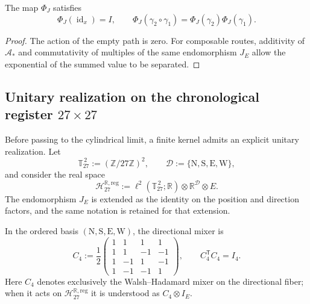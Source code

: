 \begin{proposition}
\label{prop:fase-interna-functor-rev2}
The map \(\Phi_J\) satisfies
\[
 \Phi_J(\operatorname{id}_x)=I,
 \qquad
 \Phi_J(\gamma_2\circ\gamma_1)
 =\Phi_J(\gamma_2)\Phi_J(\gamma_1).
\]
\end{proposition}

\begin{proof}
The action of the empty path is zero. For composable routes, additivity of
\(\mathcal A_*\) and commutativity of multiples of the same endomorphism
\(J_E\) allow the exponential of the summed value to be separated.
\end{proof}

\subsection{Unitary realization on the chronological register
\texorpdfstring{\(27\times27\)}{27 x 27}}
\label{sec:realizacion-unitaria-registro-27-rev3}

Before passing to the cylindrical limit, a finite kernel admits an explicit
unitary realization. Let
\[
 \mathbb T_{27}^{\,2}:=(\mathbb Z/27\mathbb Z)^2,
 \qquad
 \mathcal D:=\{\mathrm N,\mathrm S,\mathrm E,\mathrm W\},
\]
and consider the real space
\[
 \mathcal H_{27}^{\mathbb R,\mathrm{reg}}
 :=\ell^2(\mathbb T_{27}^{\,2};\mathbb R)
   \otimes\mathbb R^{\mathcal D}\otimes E.
\]
The endomorphism \(J_E\) is extended as the identity on the position and
direction factors, and the same notation is retained for that extension.

In the ordered basis
\((\mathrm N,\mathrm S,\mathrm E,\mathrm W)\), the directional mixer is
\begin{equation}
 C_4:=\frac12
 \begin{pmatrix}
  1&1&1&1\\
  1&1&-1&-1\\
  1&-1&1&-1\\
  1&-1&-1&1
 \end{pmatrix},
 \qquad C_4^{\mathsf T}C_4=I_4.
 \label{eq:mezclador-walsh-registro-27-rev3}
\end{equation}
Here \(C_4\) denotes exclusively the Walsh--Hadamard mixer on the
directional fiber; when it acts on
\(\mathcal H_{27}^{\mathbb R,\mathrm{reg}}\) it is understood as
\(C_4\otimes I_E\).

